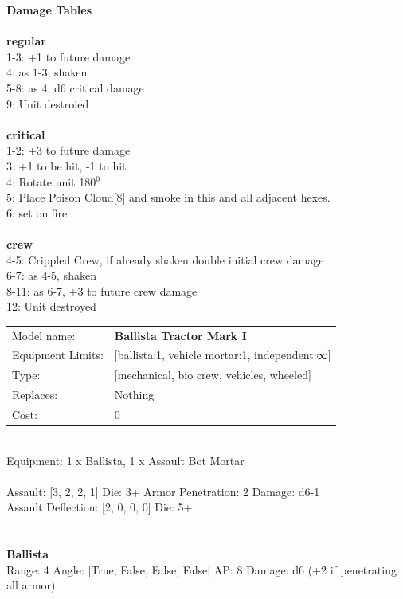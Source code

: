 {\bf Damage Tables} \\
\ \\ {\bf regular } \\
1-3: +1 to future damage \\
4: as 1-3, shaken \\
5-8: as 4, d6 critical damage \\
9: Unit destroied \\
\ \\ {\bf critical } \\
1-2: +3 to future damage \\
3: +1 to be hit, -1 to hit \\
4: Rotate unit 180$^0$ \\
5: Place Poison Cloud[8] and smoke in this and all adjacent hexes. \\
6: set on fire \\
\ \\ {\bf crew } \\
4-5: Crippled Crew, if already shaken double initial crew damage \\
6-7: as 4-5, shaken \\
8-11: as 6-7, +3 to future crew damage \\
12: Unit destroyed \\


\noindent
\begin{tabular}{ll}
Model name: &{\bf Ballista Tractor Mark I } \\
Equipment Limits: &[ballista:1, vehicle mortar:1, independent:∞] \\
Type: &[mechanical, bio crew, vehicles, wheeled] \\
Replaces: &Nothing \\
Cost: & 0\\
\end{tabular}
\ \\
Equipment: 1 x Ballista, 1 x Assault Bot Mortar \\
\ \\
Assault: [3, 2, 2, 1] Die: 3+ Armor Penetration: 2 Damage: d6-1 \\
Assault Deflection: [2, 0, 0, 0] Die: 5+\\
\indent  
\ \\

\ \\
{\bf Ballista } \\



Range: 4  Angle: [True, False, False, False] AP: 8 Damage: d6 (+2 if penetrating all armor) \\




